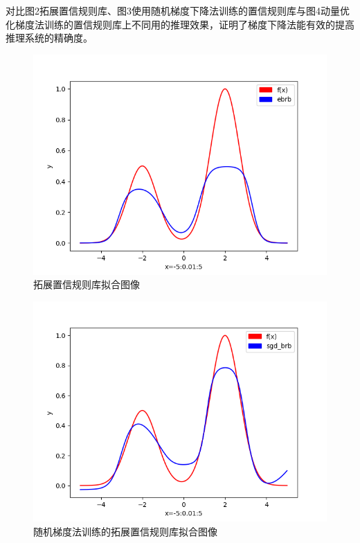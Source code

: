 \documentclass{cjc}
\begin{document}
对比图2拓展置信规则库、图3使用随机梯度下降法训练的置信规则库与图4动量优化梯度法训练的置信规则库上不同用的推理效果，证明了梯度下降法能有效的提高推理系统的精确度。
\begin{figure}
	\includegraphics[width=\linewidth]{ebrb_fit.png}
	\caption{拓展置信规则库拟合图像}
\end{figure}

\begin{figure}
	\includegraphics[width=\linewidth]{sgd_brb_fit.png}
	\caption{随机梯度法训练的拓展置信规则库拟合图像}
\end{figure}
\end{document}
